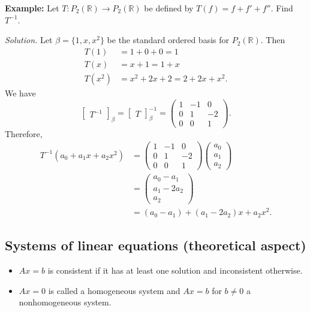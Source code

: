 \documentclass[12pt]{article}
\begin{document}
\noindent\textbf{Example:} Let $T : P_2(\mathbb{R}) \to P_2(\mathbb{R})$ be defined by $T(f) = f + f' + f''$. Find $T^{-1}$.

\textit{Solution.} Let $\beta = \{1, x, x^2\}$ be the standard ordered basis for $P_2(\mathbb{R})$. Then \begin{align*}
    T(1) &= 1 + 0 + 0 = 1 \\
    T(x) &= x + 1 = 1 + x \\
    T(x^2) &= x^2 + 2x + 2 = 2 + 2x + x^2.
\end{align*} We have $$\begin{bmatrix}
T^{-1}
\end{bmatrix}_\beta = \begin{bmatrix}
T
\end{bmatrix}_\beta^{-1} = \begin{pmatrix}
1 & -1 & 0 \\ 0 & 1 & -2 \\ 0 & 0 & 1
\end{pmatrix}.$$ Therefore, \begin{align*}
    T^{-1}(a_0 + a_1x + a_2x^2) &= \begin{pmatrix}
    1 & -1 & 0 \\ 0 & 1 & -2 \\ 0 & 0 & 1
    \end{pmatrix}\begin{pmatrix}
    a_0 \\ a_1 \\ a_2
    \end{pmatrix} \\
    &= \begin{pmatrix}
    a_0 - a_1 \\ a_1 - 2a_2 \\ a_2
    \end{pmatrix} \\
    &= (a_0 - a_1) + (a_1 - 2a_2)x + a_2x^2.
\end{align*}

\subsection{Systems of linear equations (theoretical aspect)}

\begin{itemize}
    \item $Ax = b$ is consistent if it has at least one solution and inconsistent otherwise.
    
    \item $Ax = 0$ is called a homogeneous system and $Ax = b$ for $b \neq 0$ a nonhomogeneous system.
\end{itemize}
\end{document}
